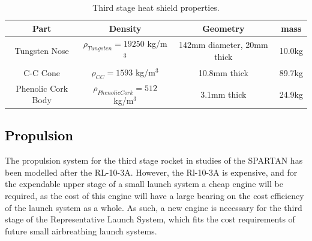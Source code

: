 		\begin{table}[h]
			\centering
\begin{tabular}{|c|c|c|c|}
	\hline  Part & Density & Geometry & mass \\ 
	\hline  Tungsten Nose & $\rho_{Tungsten} = 19250$  kg/m$^3$ & 142mm diameter, 20mm thick & 10.0kg \\ 
		\hline C-C Cone & $\rho_{CC} = 1593$  kg/m$^3$ & 10.8mm thick & 89.7kg \\ 
			\hline Phenolic Cork Body & $\rho_{Phenolic Cork} = 512$  kg/m$^3$ & 3.1mm thick & 24.9kg \\ 
	\hline 
\end{tabular} 
\caption{Third stage heat shield properties.} %
\label{tab:heatshield}
\end{table}
		
		\newpage
		\textcolor{black}{
		\subsection{Propulsion}\label{sec:thirdstageprop}
	}
	\noindent
	The propulsion system for the third stage rocket in studies of the SPARTAN has been modelled after the RL-10-3A\cite{Preller2018a}. However, the Rl-10-3A is expensive, and for the expendable upper stage of a small launch system a cheap engine will be required, as the cost of this engine will have a large bearing on the cost efficiency of the launch system as a whole. As such, a new engine is necessary for the third stage of the Representative Launch System, which fits the cost requirements of future small airbreathing launch systems.

